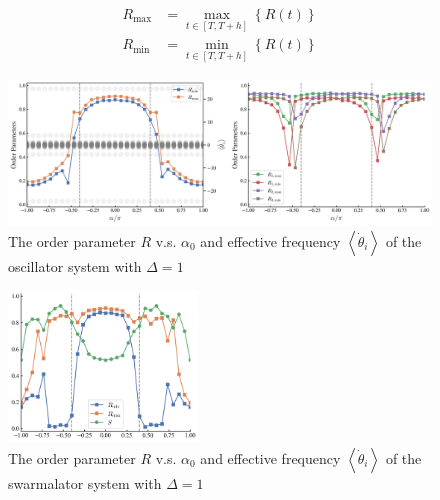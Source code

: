 \documentclass{article}
\begin{document}
\begin{subequations}
    \begin{align}
        R_{\max}&=\max_{t\in \left[ T,T+h \right]} \left\{ R\left( t \right) \right\} 
        \\
        R_{\min}&=\min_{t\in \left[ T,T+h \right]} \left\{ R\left( t \right) \right\} 
    \end{align}
\end{subequations}

\begin{figure}[H]
    \centering
    \includegraphics[width=1\textwidth]{figs/PurePhase_OrderParameter_R_l9.6_dO1.png}
    \caption{The order parameter $R$ v.s. $\alpha_0$ and effective frequency $\left<\dot{\theta}_i\right>$ of the oscillator system with $\Delta =1$}
\end{figure}

\begin{figure}[H]
    \centering
    \includegraphics[width=0.45\textwidth]{figs/MeanFieldChiralInducedPhaseLag_OrderParameter_R_l9.6_d1_dO1_rS10.png}
    \caption{The order parameter $R$ v.s. $\alpha_0$ and effective frequency $\left<\dot{\theta}_i\right>$ of the swarmalator system with $\Delta =1$}
\end{figure}
\end{document}
